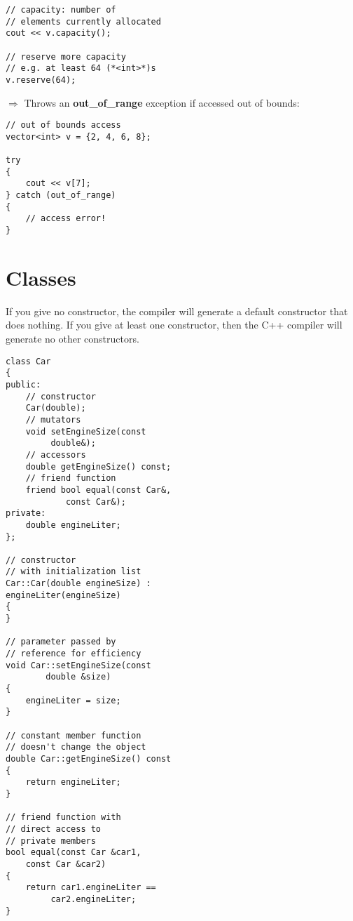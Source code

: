 \documentclass[10pt]{article}
\begin{document}
\begin{multicols*}{3}
\begin{lstlisting}
// capacity: number of 
// elements currently allocated
cout << v.capacity();

// reserve more capacity
// e.g. at least 64 (*<int>*)s
v.reserve(64);
\end{lstlisting}
$\Rightarrow$ Throws an \textbf{out\_of\_range} exception if accessed out of bounds:
\begin{lstlisting}
// out of bounds access
vector<int> v = {2, 4, 6, 8};

try
{
    cout << v[7];
} catch (out_of_range)
{
    // access error!
}
\end{lstlisting}
%
%
\section*{Classes}
\small
If you give no constructor, the compiler will generate a default constructor that does nothing.
If you give at least one constructor, then the C++ compiler will generate no other constructors.
\begin{lstlisting}
class Car
{
public:
    // constructor
    Car(double);
    // mutators
    void setEngineSize(const
         double&);
    // accessors
    double getEngineSize() const;
    // friend function
    friend bool equal(const Car&,
         	const Car&);
private:	
    double engineLiter;
};

// constructor
// with initialization list
Car::Car(double engineSize) :
engineLiter(engineSize)
{
}

// parameter passed by
// reference for efficiency
void Car::setEngineSize(const 
		double &size)
{
    engineLiter = size;
}

// constant member function
// doesn't change the object
double Car::getEngineSize() const
{
    return engineLiter;
}

// friend function with
// direct access to
// private members
bool equal(const Car &car1,
	const Car &car2)
{
    return car1.engineLiter ==
    	 car2.engineLiter;
}
\end{lstlisting}
%
%

\end{multicols*}
\end{document}

